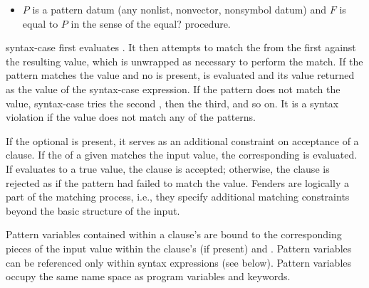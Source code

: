 \begin{entry}{%
}
\begin{itemize}
\item $P$ is a pattern datum (any nonlist, nonvector, nonsymbol
datum) and $F$ is equal to $P$ in the sense of the
{\cf equal?} procedure.
\end{itemize}

\semantics
{\cf syntax-case} first evaluates .
It then attempts to match
the  from the first  against the resulting value,
which is unwrapped as necessary to perform the match.
If the pattern matches the value and no
 is present,
 is evaluated and its value returned as the
value of the {\cf syntax-case} expression.
If the pattern does not match the value, {\cf syntax-case} tries
the second , then the third, and so on.
It is a syntax violation if the value does not match any of the patterns.

If the optional  is present, it serves as an additional
constraint on acceptance of a clause.
If the  of a given  matches the input value,
the corresponding  is evaluated.
If  evaluates to a true value, the clause is accepted;
otherwise, the clause is rejected as if the pattern had failed to match
the value.
Fenders are logically a part of the matching process, i.e., they
specify additional matching constraints beyond the basic structure of
the input.

Pattern variables contained within a clause's
 are bound to the corresponding pieces of the input
value within the clause's  (if present) and
.
Pattern variables can be referenced only within {\cf syntax}
expressions (see below).
Pattern variables occupy the same name space as program variables and
keywords.
\end{entry}

